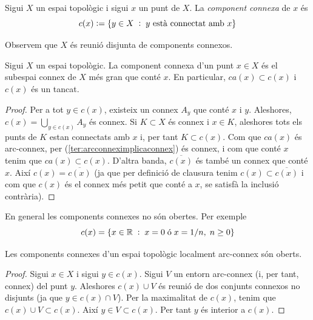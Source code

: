 \documentclass[../main.tex]{subfiles}
\begin{document}
\begin{defi}
\label{def:componentconnexa} Sigui $X$ un espai topològic i sigui $x$ un punt de $X$. La \textit{component connexa} de $x$ és \begin{equation}
    \notag
    c(x) := \{y\in X\;:\;\text{$y$ està connectat amb $x$}\}
\end{equation}
\end{defi}

Observem que $X$ és reunió disjunta de components connexos.

\begin{prop}
\label{prop:componentconnexa1} Sigui $X$ un espai topològic. La component connexa d'un punt $x\in X$ és el subespai connex de $X$ més gran que conté $x$. En particular, $ca(x)\subset c(x)$ i $c(x)$ és un tancat.
\end{prop}
\begin{proof}
Per a tot $y\in c(x)$, existeix un connex $A_y$ que conté $x$ i $y$. Aleshores, $c(x) = \bigcup_{y\in c(x)}A_y$ és connex. Si $K\subset X$ és connex i $x\in K$, aleshores tots els punts de $K$ estan connectats amb $x$ i, per tant $K\subset c(x)$. Com que $ca(x)$ és arc-connex, per (\ref{ter:arcconneximplicaconnex}) és connex, i com que conté $x$ tenim que $ca(x)\subset c(x)$. D'altra banda, $\overline{c(x)}$ és també un connex que conté $x$. Així $c(x) = \overline{c(x)}$ (ja que per definició de clausura tenim $c(x)\subset\overline{c(x)}$ i com que $c(x)$ és el connex més petit que conté a $x$, se satisfà la inclusió contrària).
\end{proof}

En general les components connexes no són obertes. Per exemple
\begin{equation}
    \notag
    c(x) = \{x\in\mathbb{R}\;:\;x = 0\;\text{ó}\;x=1/n,\;n\geq 0\}
\end{equation}

\begin{prop}
\label{prop:componentconnexa2} Les components connexes d'un espai topològic localment arc-connex són oberts.
\end{prop}
\begin{proof}
Sigui $x\in X$ i sigui $y\in c(x)$. Sigui $V$ un entorn arc-connex (i, per tant, connex) del punt $y$. Aleshores $c(x)\cup V$ és reunió de dos conjunts connexos no disjunts (ja que $y\in c(x)\cap V$). Per la maximalitat de $c(x)$, tenim que $c(x)\cup V\subset c(x)$. Així $y\in V\subset c(x)$. Per tant $y$ és interior a $c(x)$.
\end{proof}
\end{document}
